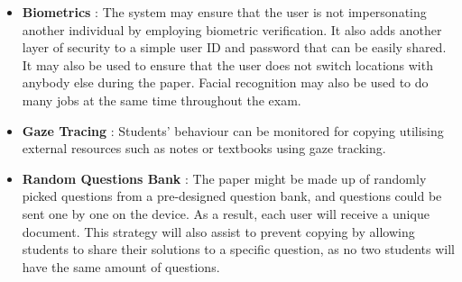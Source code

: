 \documentclass[10pt,a4paper,twoside]{article}
\begin{document}
\begin{itemize}
\item \textbf{Biometrics} : The system may ensure that the user is not impersonating another individual by employing biometric verification. It also adds another layer of security to a simple user ID and password that can be easily shared. It may also be used to ensure that the user does not switch locations with anybody else during the paper. Facial recognition may also be used to do many jobs at the same time throughout the exam.

\item \textbf{Gaze Tracing} : Students' behaviour can be monitored for copying utilising external resources such as notes or textbooks using gaze tracking.

\item \textbf{Random Questions Bank} : The paper might be made up of randomly picked questions from a pre-designed question bank, and questions could be sent one by one on the device. As a result, each user will receive a unique document. This strategy will also assist to prevent copying by allowing students to share their solutions to a specific question, as no two students will have the same amount of questions.

\end{itemize}
\end{document}
